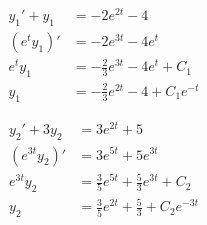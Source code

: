 \begin{exampleSol}
\begin{enumerate}[1.]
\begin{minipage}{0.49\textwidth}
\begin{equation*}
\begin{split}
y_1' + y_1 &= -2e^{2t} - 4 \\ 
(e^t y_1)' &= -2e^{3t} - 4e^t \\
e^t y_1 &= -\frac{2}{3}e^{3t} - 4e^{t} + C_1 \\
y_1 &= -\frac{2}{3}e^{2t} - 4 + C_1e^{-t} 
\end{split}
\end{equation*}
\end{minipage}
\begin{minipage}{0.49\textwidth}
\begin{equation*}
\begin{split}
y_2' + 3y_2 &= 3e^{2t} + 5 \\ 
(e^{3t} y_2)' &= 3e^{5t} + 5e^{3t} \\
e^{3t} y_2 &= \frac{3}{5}e^{5t} + \frac{5}{3}e^{3t} + C_2 \\
y_2 &= \frac{3}{5}e^{2t} + \frac{5}{3} + C_2e^{-3t}
\end{split}
\end{equation*}
\end{minipage}


\end{enumerate}
\end{exampleSol}
